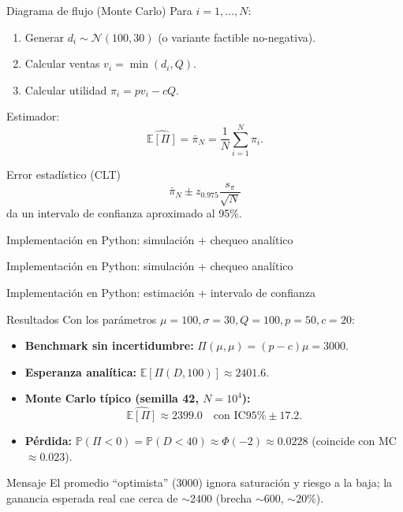 \documentclass[aspectratio=1610, 9pt]{beamer}
\begin{document}
\begin{frame}{Diagrama de flujo (Monte Carlo)}
Para $i=1,\dots,N$:
\begin{enumerate}
  \item Generar $d_i \sim \mathcal N(100,30)$ (o variante factible no-negativa).
  \item Calcular ventas $v_i=\min(d_i,Q)$.
  \item Calcular utilidad $\pi_i = p v_i - cQ$.
\end{enumerate}

Estimador:
\[
\widehat{\mathbb E[\Pi]}=\bar \pi_N=\frac{1}{N}\sum_{i=1}^N \pi_i.
\]

\begin{block}{Error estadístico (CLT)}
\[
\bar \pi_N \pm z_{0.975}\frac{s_\pi}{\sqrt{N}}
\]
da un intervalo de confianza aproximado al 95\%.
\end{block}
\end{frame}

\begin{frame}[fragile]{Implementación en Python: simulación + chequeo analítico}
\end{frame}

\begin{frame}[fragile]{Implementación en Python: simulación + chequeo analítico}
\end{frame}

\begin{frame}[fragile]{Implementación en Python: estimación + intervalo de confianza}
\end{frame}

\begin{frame}{Resultados}
Con los parámetros $\mu=100,\sigma=30,Q=100,p=50,c=20$:

\begin{itemize}
  \item \textbf{Benchmark sin incertidumbre:} $\Pi(\mu,\mu)=(p-c)\mu=3000$.
  \item \textbf{Esperanza analítica:} $\mathbb E[\Pi(D,100)]\approx 2401.6$.
  \item \textbf{Monte Carlo típico (semilla 42, $N=10^4$):}
  \[
  \widehat{\mathbb E[\Pi]}\approx 2399.0
  \quad \text{con IC95\% } \pm 17.2.
  \]
  \item \textbf{Pérdida:} $\mathbb P(\Pi<0)=\mathbb P(D<40)\approx \Phi(-2)\approx 0.0228$ (coincide con MC $\approx 0.023$).
\end{itemize}

\begin{alertblock}{Mensaje}
El promedio ``optimista'' (3000) ignora saturación y riesgo a la baja; la ganancia esperada real cae cerca de \(\sim 2400\) (brecha $\sim 600$, \(\sim 20\%\)).
\end{alertblock}
\end{frame}
\end{document}
